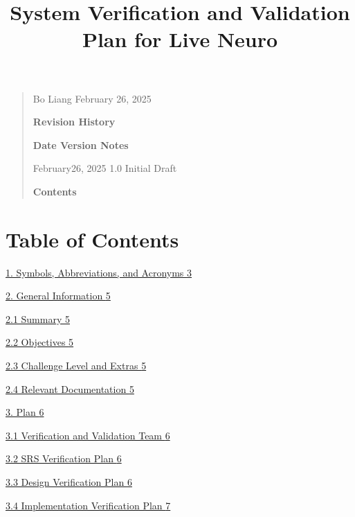 \documentclass[
]{article}
\title{System Verification and Validation Plan for Live Neuro}
\author{}
\date{}
\begin{document}
\maketitle

\begin{quote}
Bo Liang February 26, 2025

\textbf{Revision History}

\textbf{Date Version Notes}

February26, 2025 1.0 Initial Draft

\textbf{Contents}
\end{quote}

\hypertarget{table-of-contents}{%
\section{Table of Contents}\label{table-of-contents}}

\protect\hyperlink{symbols-abbreviations-and-acronyms}{1. Symbols,
Abbreviations, and Acronyms
\protect\hyperlink{symbols-abbreviations-and-acronyms}{3}}

\protect\hyperlink{general-information}{2. General Information
\protect\hyperlink{general-information}{5}}

\protect\hyperlink{summary}{2.1 Summary \protect\hyperlink{summary}{5}}

\protect\hyperlink{objectives}{2.2 Objectives
\protect\hyperlink{objectives}{5}}

\protect\hyperlink{challenge-level-and-extras}{2.3 Challenge Level and
Extras \protect\hyperlink{challenge-level-and-extras}{5}}

\protect\hyperlink{relevant-documentation}{2.4 Relevant Documentation
\protect\hyperlink{relevant-documentation}{5}}

\protect\hyperlink{plan}{3. Plan \protect\hyperlink{plan}{6}}

\protect\hyperlink{verification-and-validation-team}{3.1 Verification
and Validation Team
\protect\hyperlink{verification-and-validation-team}{6}}

\protect\hyperlink{srs-verification-plan}{3.2 SRS Verification Plan
\protect\hyperlink{srs-verification-plan}{6}}

\protect\hyperlink{design-verification-plan}{3.3 Design Verification
Plan \protect\hyperlink{design-verification-plan}{6}}

\protect\hyperlink{_Toc191500205}{3.4 Implementation Verification Plan
\protect\hyperlink{_Toc191500205}{7}}
\end{document}
